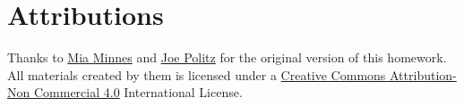 \documentclass[12pt, oneside]{article}
\begin{document}
\section*{Attributions}

Thanks to \href{http://cseweb.ucsd.edu/~minnes/}{Mia Minnes} and \href{https://jpolitz.github.io/}{Joe Politz} for the original version of this homework. All materials created by them is licensed under a \href{http://creativecommons.org/licenses/by-nc/4.0/}{Creative Commons Attribution-Non Commercial 4.0} International License.
\end{document}
